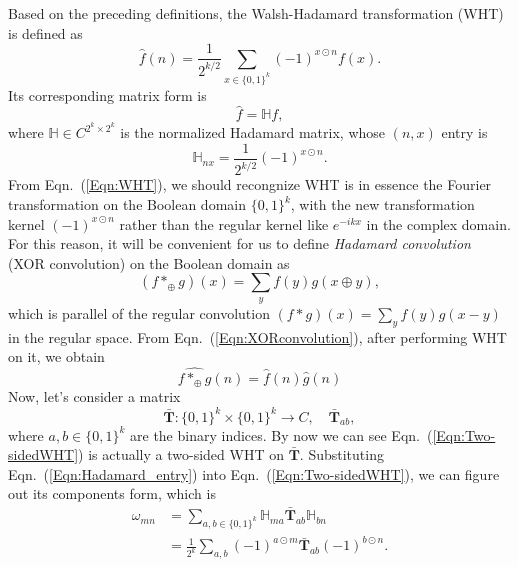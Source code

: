 Based on the preceding definitions, the Walsh-Hadamard transformation (WHT) is defined as
\begin{equation}
    \hat{f}(n)=\frac{1}{2^{k/2}}\sum_{x\in\{0,1\}^k}(-1)^{x\odot n}f(x).
    \label{Eqn:WHT}
\end{equation}
Its corresponding matrix form is 
\begin{equation}
    \hat{f}=\mathbb{H}f,
\end{equation}
where $\mathbb{H}\in C^{2^k\times2^k}$ is the normalized Hadamard matrix, whose $(n,x)$ entry is 
\begin{equation}
    \mathbb{H}_{nx}=\frac{1}{2^{k/2}}(-1)^{x\odot n}. 
    \label{Eqn:Hadamard_entry}
\end{equation}
From Eqn.~(\ref{Eqn:WHT}), we should recongnize WHT is in essence the Fourier transformation on the Boolean domain $\{0,1\}^k$, with the new transformation kernel $(-1)^{x\odot n}$ rather than the regular kernel like $e^{-ikx}$ in the complex domain. For this reason, it will be convenient for us to define \textit{Hadamard convolution} (XOR convolution) on the Boolean domain as 
\begin{equation}
    (f*_{\oplus}g)(x)=\sum_{y}f(y)g(x\oplus y),
    \label{Eqn:XORconvolution}
\end{equation}
which is parallel of the regular convolution $(f*g)(x)=\sum_{y}f(y)g(x-y)$ in the regular space.
From Eqn.~(\ref{Eqn:XORconvolution}), after  performing WHT on it, we obtain
\begin{equation}
    \widehat{f*_{\oplus}g}(n)=\hat{f}(n)\hat{g}(n)
    \label{Eqn:WHTconvolution}
\end{equation}
Now, let's consider a matrix
\begin{equation}
    \bar{\textbf{T}}:\{0,1\}^k\times\{0,1\}^k\rightarrow C, \quad \bar{\textbf{T}}_{ab},
\end{equation}
where $a,b\in\{0,1\}^k$ are the binary indices. By now we can see Eqn.~(\ref{Eqn:Two-sidedWHT}) is actually a two-sided WHT on $\bar{\textbf{T}}$. Substituting Eqn.~(\ref{Eqn:Hadamard_entry}) into Eqn.~(\ref{Eqn:Two-sidedWHT}), we can figure out its components form, which is
\begin{equation} 
    \begin{split}
        \omega_{mn}&=\sum_{a,b\in\{0,1\}^k}\mathbb{H}_{ma}\bar{\textbf{T}}_{ab}\mathbb{H}_{bn} \\
        &=\frac{1}{2^k}\sum_{a,b}(-1)^{a\odot m}\bar{\textbf{T}}_{ab}(-1)^{b\odot n}.
    \end{split}
    \label{Eqn:ComponentFormofTwo-sidedWHT}
\end{equation}
